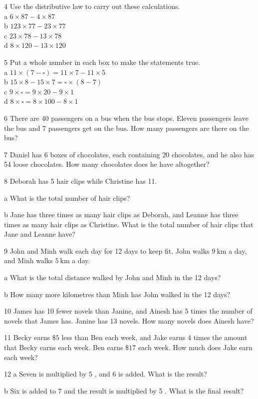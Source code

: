 \documentclass[10pt]{article}
\begin{document}
4 Use the distributive law to carry out these calculations.\\
a \(6 \times 87-4 \times 87\)\\
b \(123 \times 77-23 \times 77\)\\
c \(23 \times 78-13 \times 78\)\\
d \(8 \times 120-13 \times 120\)

5 Put a whole number in each box to make the statements true.\\
a \(11 \times(7-\square)=11 \times 7-11 \times 5\)\\
b \(15 \times 8-15 \times 7=\square \times(8-7)\)\\
c \(9 \times \square=9 \times 20-9 \times 1\)\\
d \(8 \times \square=8 \times 100-8 \times 1\)

6 There are 40 passengers on a bus when the bus stops. Eleven passengers leave the bus and 7 passengers get on the bus. How many passengers are there on the bus?

7 Daniel has 6 boxes of chocolates, each containing 20 chocolates, and he also has 54 loose chocolates. How many chocolates does he have altogether?

8 Deborah has 5 hair clips while Christine has 11.

a What is the total number of hair clips?

b Jane has three times as many hair clips as Deborah, and Leanne has three times as many hair clips as Christine. What is the total number of hair clips that Jane and Leanne have?

9 John and Minh walk each day for 12 days to keep fit. John walks \(9 \mathrm{~km}\) a day, and Minh walks \(5 \mathrm{~km}\) a day.

a What is the total distance walked by John and Minh in the 12 days?

b How many more kilometres than Minh has John walked in the 12 days?

10 James has 10 fewer novels than Janine, and Ainesh has 5 times the number of novels that James has. Janine has 13 novels. How many novels does Ainesh have?

11 Becky earns \(\$ 5\) less than Ben each week, and Jake earns 4 times the amount that Becky earns each week. Ben earns \(\$ 17\) each week. How much does Jake earn each week?

12 a Seven is multiplied by 5 , and 6 is added. What is the result?

b Six is added to 7 and the result is multiplied by 5 . What is the final result?
\end{document}
